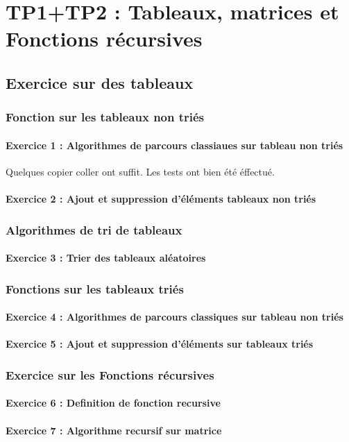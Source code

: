 \chapter{TP1+TP2 : Tableaux, matrices et Fonctions récursives}
    \section{Exercice sur des tableaux}
        \subsection{Fonction sur les tableaux non triés}
            \subsubsection{Exercice 1 : Algorithmes de parcours classiaues sur tableau non triés}
	              Quelques copier coller ont suffit.
                Les tests ont bien été éffectué.
            \subsubsection{Exercice 2 : Ajout et suppression d'éléments tableaux non triés}
        \subsection{Algorithmes de tri de tableaux}
            \subsubsection{Exercice 3 : Trier des tableaux aléatoires}
        \subsection{Fonctions sur les tableaux triés}
            \subsubsection{Exercice 4 : Algorithmes de parcours classiques sur tableau non triés}
            \subsubsection{Exercice 5 : Ajout et suppression d’éléments sur tableaux triés}
        \subsection{Exercice sur les Fonctions récursives}
  	    \subsubsection{Exercice 6 : Definition de fonction recursive}
  	    \subsubsection{Exercice 7 : Algorithme recursif sur matrice}

